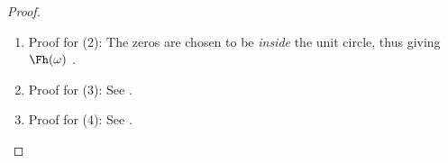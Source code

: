 \begin{proof}
\begin{enumerate}
\begin{enumerate}
    \item Proof that $\Fphi(\omega)$ is  at $0$:
      \begin{align*}
            &\Zh(z) = \sqrt{2}\brp{\frac{1+z^{-1}}{2}}^p Q(z)
            && \text{by \prefp{def:Dp}}
          \\&\implies \text{$\fpsi$ has \prope{$p$ vanishing moments}}
            && \text{by \prefp{lem:van_factor}}
          \\&\implies \text{$\Fphi(\omega)$ is \prope{continuous} at $\omega=0$}
            && \text{by \prefp{thm:vanish_continuous}}
      \end{align*}

    \item Proof that $\ds\inf_{\omega\in\intcc{-\pi/2}{\pi/2}}\abs{\Dh(\omega)}>0$:\\
          by ---note that the zeros are never on the unit circle in the range $\intcc{-\pi/2}{\pi/2}$.
  \end{enumerate}


\item Proof for (2): The zeros are chosen to be \emph{inside} the unit circle, thus giving $\Fh(\omega)$ .

\item Proof for (3): See .

\item Proof for (4): See .
\end{enumerate}
\end{proof}



